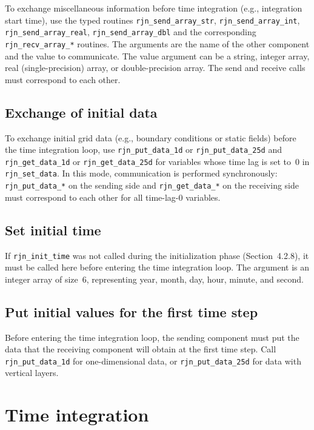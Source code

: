 \documentclass[11pt,a4paper]{report}
\begin{document}
To exchange miscellaneous information before time integration
(e.g., integration start time),
use the typed routines \texttt{rjn\_send\_array\_str},
\texttt{rjn\_send\_array\_int}, \texttt{rjn\_send\_array\_real},
\texttt{rjn\_send\_array\_dbl} and the corresponding
\texttt{rjn\_recv\_array\_*} routines.
The arguments are the name of the other component
and the value to communicate.
The value argument can be
a string, integer array,
real (single-precision) array,
or double-precision array.
The send and receive calls must correspond to each other.

\subsection{Exchange of initial data}

To exchange initial grid data
(e.g., boundary conditions or static fields)
before the time integration loop,
use \texttt{rjn\_put\_data\_1d} or \texttt{rjn\_put\_data\_25d}
and \texttt{rjn\_get\_data\_1d} or \texttt{rjn\_get\_data\_25d}
for variables whose time lag is set to~0
in \texttt{rjn\_set\_data}.
In this mode, communication is performed synchronously:
\texttt{rjn\_put\_data\_*} on the sending side
and \texttt{rjn\_get\_data\_*} on the receiving side
must correspond to each other
for all time-lag-0 variables.

\subsection{Set initial time}

If \texttt{rjn\_init\_time} was not called
during the initialization phase (Section~4.2.8),
it must be called here
before entering the time integration loop.
The argument is an integer array of size~6,
representing year, month, day, hour, minute, and second.

\subsection{Put initial values for the first time step}

Before entering the time integration loop,
the sending component must put the data
that the receiving component will obtain at the first time step.
Call \texttt{rjn\_put\_data\_1d} for one-dimensional data,
or \texttt{rjn\_put\_data\_25d} for data with vertical layers.



\section{Time integration}
\end{document}
